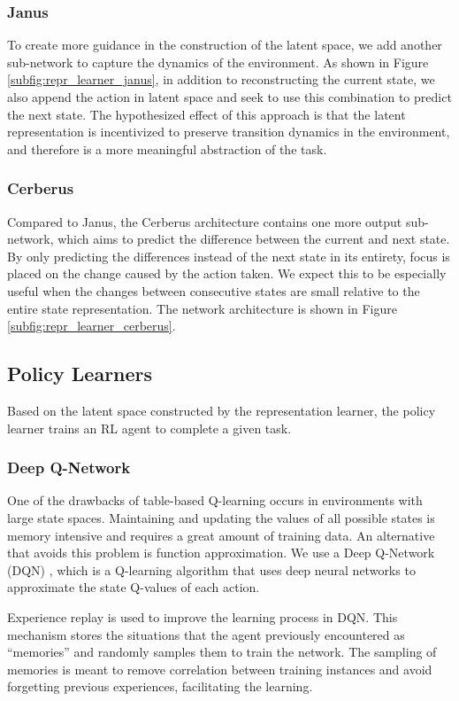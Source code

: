 \subsubsection{Janus}
To create more guidance in the construction of the latent space, we add another sub-network to capture the dynamics of the environment. 
As shown in Figure \ref{subfig:repr_learner_janus},
in addition to reconstructing the current state, we also append the action in latent space and seek to use this combination to predict the next state.
The hypothesized effect of this approach is that the latent representation is incentivized to preserve transition dynamics in the environment, and therefore is a more meaningful abstraction of the task.

\subsubsection{Cerberus}
Compared to Janus, the Cerberus architecture contains one more output sub-network, which aims to predict the difference between the current and next state. 
By only predicting the differences instead of the next state in its entirety, focus is placed on the change caused by the action taken.
We expect this to be especially useful when the changes between consecutive states are small relative to the entire state representation.
The network architecture is shown in Figure \ref{subfig:repr_learner_cerberus}.  

\subsection{Policy Learners}
Based on the latent space constructed by the representation learner, the policy learner trains an RL agent to complete a given task.

\subsubsection{Deep Q-Network}
One of the drawbacks of table-based Q-learning occurs in environments with large state spaces.
Maintaining and updating the values of all possible states is memory intensive and requires a great amount of training data.
An alternative that avoids this problem is function approximation. 
We use a Deep Q-Network (DQN) \citep{DQN}, which is a Q-learning algorithm that uses deep neural networks to approximate the state Q-values of each action.

Experience replay is used to improve the learning process in DQN. 
This mechanism stores the situations that the agent previously encountered as ``memories'' and randomly samples them to train the network. 
The sampling of memories is meant to remove correlation between training instances and avoid forgetting previous experiences, facilitating the learning.

